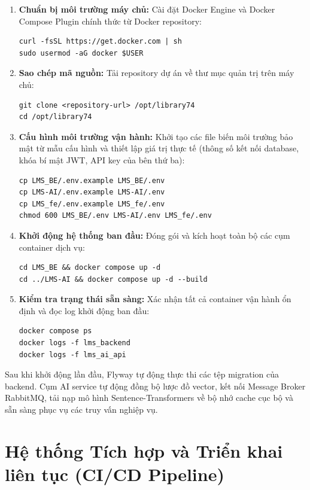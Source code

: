 \begin{enumerate}
    \item \textbf{Chuẩn bị môi trường máy chủ:} Cài đặt Docker Engine và Docker Compose
          Plugin chính thức từ Docker repository:
\begin{verbatim}
curl -fsSL https://get.docker.com | sh
sudo usermod -aG docker $USER
\end{verbatim}

    \item \textbf{Sao chép mã nguồn:} Tải repository dự án về thư mục quản trị trên máy chủ:
\begin{verbatim}
git clone <repository-url> /opt/library74
cd /opt/library74
\end{verbatim}

    \item \textbf{Cấu hình môi trường vận hành:} Khởi tạo các file biến môi trường bảo mật từ mẫu cấu hình và thiết lập giá trị thực tế (thông số kết nối database, khóa bí mật JWT, API key của bên thứ ba):
\begin{verbatim}
cp LMS_BE/.env.example LMS_BE/.env
cp LMS-AI/.env.example LMS-AI/.env
cp LMS_fe/.env.example LMS_fe/.env
chmod 600 LMS_BE/.env LMS-AI/.env LMS_fe/.env
\end{verbatim}

    \item \textbf{Khởi động hệ thống ban đầu:} Đóng gói và kích hoạt toàn bộ các cụm container dịch vụ:
\begin{verbatim}
cd LMS_BE && docker compose up -d
cd ../LMS-AI && docker compose up -d --build
\end{verbatim}

    \item \textbf{Kiểm tra trạng thái sẵn sàng:} Xác nhận tất cả container vận hành ổn định và đọc log khởi động ban đầu:
\begin{verbatim}
docker compose ps
docker logs -f lms_backend
docker logs -f lms_ai_api
\end{verbatim}
\end{enumerate}

Sau khi khởi động lần đầu, Flyway tự động thực thi các tệp migration của backend. Cụm AI service tự động đồng bộ lược đồ vector, kết nối Message Broker RabbitMQ, tải nạp mô hình Sentence-Transformers về bộ nhớ cache cục bộ và sẵn sàng phục vụ các truy vấn nghiệp vụ.

\section{Hệ thống Tích hợp và Triển khai liên tục (CI/CD Pipeline)}
\label{sec:cicd_pipeline}

